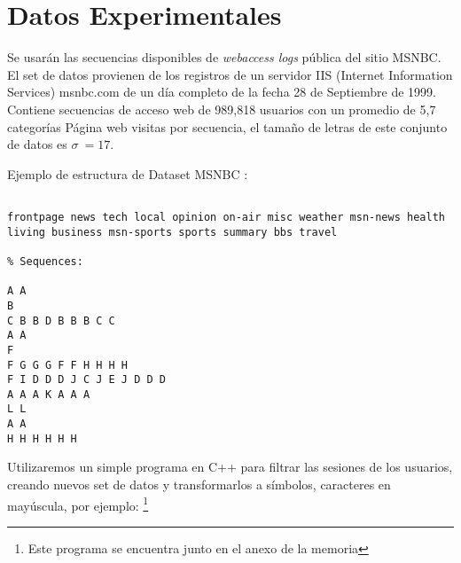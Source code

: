 






\section{Datos Experimentales}

Se usarán las secuencias disponibles de \emph{webaccess logs} pública del sitio MSNBC. El set de datos provienen de los registros de un servidor IIS (Internet Information Services) msnbc.com de un día completo de la fecha  28 de Septiembre de 1999. 
Contiene secuencias de acceso web de 989,818 usuarios con un promedio de 5,7  categorías Página web visitas por secuencia, el tamaño de letras de este conjunto de datos es $\sigma \ = 17$.


Ejemplo de estructura de Dataset MSNBC :
\vspace{0.5cm}

\begin{lstlisting}[frame=single,basicstyle=\ttfamily\tiny,]
% Different categories found in input file:

frontpage news tech local opinion on-air misc weather msn-news health living business msn-sports sports summary bbs travel

% Sequences:

A A 
B 
C B B D B B B C C 
A A 
F 
F G G G F F H H H H 
F I D D D J C J E J D D D 
A A A K A A A 
L L 
A A 
H H H H H H 
\end{lstlisting}





Utilizaremos un simple programa en C++ para filtrar las sesiones de los usuarios, creando nuevos set de datos y transformarlos a símbolos, caracteres en mayúscula, por ejemplo: 
\footnote{Este programa se encuentra junto en el anexo de la memoria}

